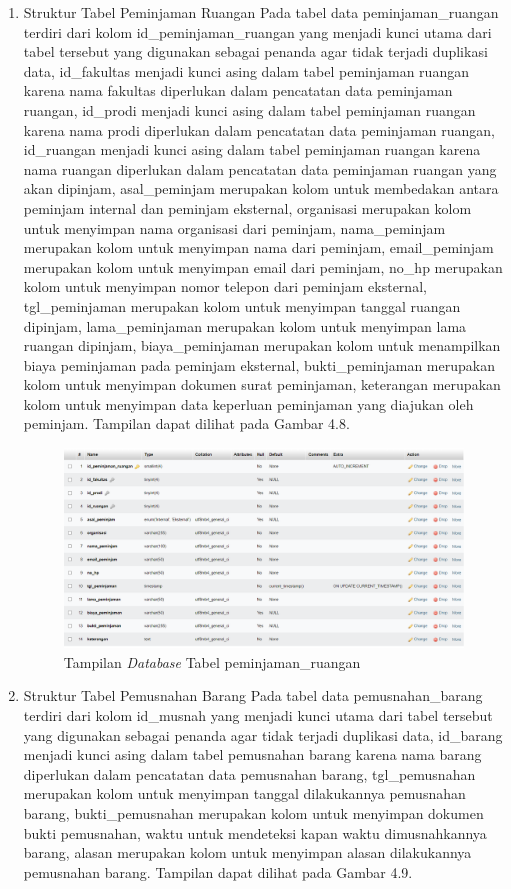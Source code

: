 \begin{enumerate}
  \item Struktur Tabel Peminjaman Ruangan
        Pada tabel data peminjaman\_ruangan terdiri dari kolom id\_peminjaman\_ruangan yang menjadi kunci utama dari tabel tersebut yang digunakan sebagai penanda agar tidak terjadi duplikasi data,	id\_fakultas menjadi kunci asing dalam tabel peminjaman ruangan karena nama fakultas diperlukan dalam pencatatan data peminjaman ruangan,	id\_prodi menjadi kunci asing dalam tabel peminjaman ruangan karena nama prodi diperlukan dalam pencatatan data peminjaman ruangan,	id\_ruangan menjadi kunci asing dalam tabel peminjaman ruangan karena nama ruangan diperlukan dalam pencatatan data peminjaman ruangan yang akan dipinjam, asal\_peminjam merupakan kolom untuk membedakan antara peminjam internal dan peminjam eksternal,	organisasi merupakan kolom untuk menyimpan nama organisasi dari peminjam,	nama\_peminjam merupakan kolom untuk menyimpan nama dari peminjam, email\_peminjam merupakan kolom untuk menyimpan email dari peminjam, no\_hp merupakan kolom untuk menyimpan nomor telepon dari peminjam eksternal, tgl\_peminjaman merupakan kolom untuk menyimpan tanggal ruangan dipinjam, lama\_peminjaman merupakan kolom untuk menyimpan lama ruangan dipinjam,	biaya\_peminjaman merupakan kolom untuk menampilkan biaya peminjaman pada peminjam eksternal, bukti\_peminjaman merupakan kolom untuk menyimpan dokumen surat peminjaman, keterangan merupakan kolom untuk menyimpan data keperluan peminjaman yang diajukan oleh peminjam. Tampilan dapat dilihat pada Gambar 4.8.

        \begin{figure}
          \centering
          \includegraphics[width=0.82\linewidth]{konten//gambar/Tampilan database tabel peminjaman_ruangan.png}
          \caption{Tampilan \textit{Database} Tabel peminjaman\_ruangan}
          \label{fig:enter-label}
        \end{figure}

  \item Struktur Tabel Pemusnahan Barang
        Pada tabel data pemusnahan\_barang terdiri dari kolom
        id\_musnah yang menjadi kunci utama dari tabel tersebut yang digunakan sebagai penanda agar tidak terjadi duplikasi data, id\_barang menjadi kunci asing dalam tabel pemusnahan barang karena nama barang diperlukan dalam pencatatan data pemusnahan barang, tgl\_pemusnahan merupakan kolom untuk menyimpan tanggal dilakukannya pemusnahan barang, bukti\_pemusnahan merupakan kolom untuk menyimpan dokumen bukti pemusnahan, waktu untuk mendeteksi kapan waktu dimusnahkannya barang, alasan merupakan kolom untuk menyimpan alasan dilakukannya pemusnahan barang. Tampilan dapat dilihat pada Gambar 4.9.


\end{enumerate}
